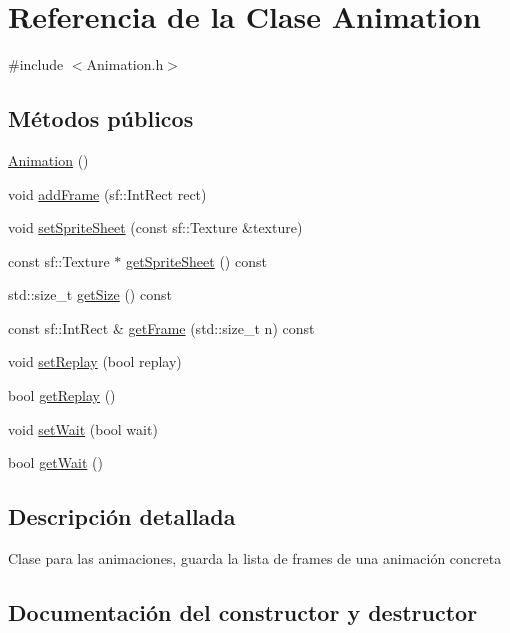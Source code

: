 \hypertarget{classAnimation}{}\section{Referencia de la Clase Animation}
\label{classAnimation}


{\ttfamily \#include $<$Animation.\+h$>$}

\subsection*{Métodos públicos}
\begin{DoxyCompactItemize}
\item 
\hyperlink{classAnimation_a83f0a16cef7117f187ad596de38dd9d6}{Animation} ()
\item 
void \hyperlink{classAnimation_a486ee5fa2d40ae90f227a19866998c91}{add\+Frame} (sf\+::\+Int\+Rect rect)
\item 
void \hyperlink{classAnimation_a2fb16f452a323d51a0104c0aa454cab3}{set\+Sprite\+Sheet} (const sf\+::\+Texture \&texture)
\item 
const sf\+::\+Texture $\ast$ \hyperlink{classAnimation_aafed5696c35b893bb721aa1303d5e84f}{get\+Sprite\+Sheet} () const 
\item 
std\+::size\+\_\+t \hyperlink{classAnimation_aa8dc627c1800fcad9b9e53c9a102ded3}{get\+Size} () const 
\item 
const sf\+::\+Int\+Rect \& \hyperlink{classAnimation_ad587678b331518e926b19b807b153daa}{get\+Frame} (std\+::size\+\_\+t n) const 
\item 
void \hyperlink{classAnimation_ae12f4c253d6c83ee8407a5395a270f6e}{set\+Replay} (bool replay)
\item 
bool \hyperlink{classAnimation_a553400098a1be7345942f1c189b5d78d}{get\+Replay} ()
\item 
void \hyperlink{classAnimation_a17273537e876ed1f04857601fb484091}{set\+Wait} (bool wait)
\item 
bool \hyperlink{classAnimation_ab0f6daf2ca2965d75e6ab480025de553}{get\+Wait} ()
\end{DoxyCompactItemize}


\subsection{Descripción detallada}
Clase para las animaciones, guarda la lista de frames de una animación concreta 

\subsection{Documentación del constructor y destructor}
\hypertarget{classAnimation_a83f0a16cef7117f187ad596de38dd9d6}{}

